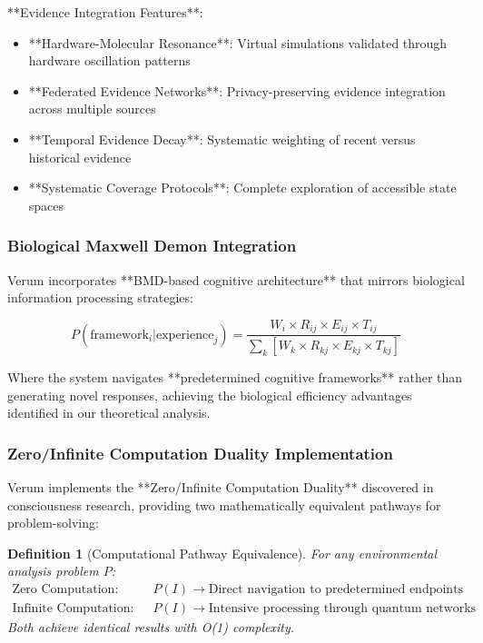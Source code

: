 \documentclass[12pt,a4paper]{article}
\newtheorem{definition}[theorem]{Definition}
\begin{document}
**Evidence Integration Features**:
\begin{itemize}
\item **Hardware-Molecular Resonance**: Virtual simulations validated through hardware oscillation patterns
\item **Federated Evidence Networks**: Privacy-preserving evidence integration across multiple sources
\item **Temporal Evidence Decay**: Systematic weighting of recent versus historical evidence
\item **Systematic Coverage Protocols**: Complete exploration of accessible state spaces
\end{itemize}

\subsubsection{Biological Maxwell Demon Integration}

Verum incorporates **BMD-based cognitive architecture** that mirrors biological information processing strategies:

$$P(\text{framework}_i | \text{experience}_j) = \frac{W_i \times R_{ij} \times E_{ij} \times T_{ij}}{\sum_k[W_k \times R_{kj} \times E_{kj} \times T_{kj}]}$$

Where the system navigates **predetermined cognitive frameworks** rather than generating novel responses, achieving the biological efficiency advantages identified in our theoretical analysis.

\subsubsection{Zero/Infinite Computation Duality Implementation}

Verum implements the **Zero/Infinite Computation Duality** discovered in consciousness research, providing two mathematically equivalent pathways for problem-solving:

\begin{definition}[Computational Pathway Equivalence]
For any environmental analysis problem $P$:
\begin{align}
\text{Zero Computation:} \quad &P(I) \to \text{Direct navigation to predetermined endpoints} \\
\text{Infinite Computation:} \quad &P(I) \to \text{Intensive processing through quantum networks}
\end{align}
Both achieve identical results with O(1) complexity.
\end{definition}
\end{document}
